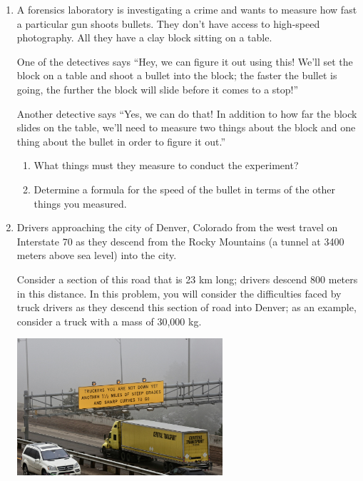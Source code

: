 \documentclass[12pt]{article}
\begin{document}
\begin{enumerate}
\bigskip

\item A forensics laboratory is investigating a crime and wants to measure how fast a particular gun shoots bullets. They don't have access to high-speed photography. All they have a clay block sitting on a table.

One of the detectives says ``Hey, we can figure it out using this! We'll set the block on a table and shoot a bullet into the block; the faster the bullet is going, the further the block will slide before it comes to a stop!''

Another detective says ``Yes, we can do that! In addition to how far the block slides on the table, we'll need to measure two things about the block and one thing about the bullet in order to figure it out.''

\begin{enumerate}
	\item What things must they measure to conduct the experiment?
	\item Determine a formula for the speed of the bullet in terms of the other things you measured.
\end{enumerate}

\item Drivers approaching the city of Denver, Colorado from the west travel on Interstate 70 as they descend from the Rocky Mountains (a tunnel at 3400 meters above sea level) into the city. 
\medskip

\begin{minipage}{3in}
Consider a section of this road that is 23 km long; drivers descend 800 meters in this distance. In this problem, you will consider the difficulties faced by truck drivers as they descend this section of road into Denver; as an example, consider a truck with a mass of 30,000 kg.

\end{minipage}
\begin{minipage}{4in}
\begin{center}
\includegraphics[width=3in]{trucker-sign.jpg}


\end{center}
\end{minipage}
\end{enumerate}
\end{document}
